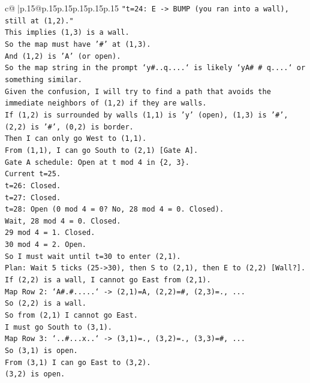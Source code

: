 \documentclass{article}
\begin{document}
{\begin{supertabular}{c@{$\;$}|p{.15\linewidth}@{}p{.15\linewidth}p{.15\linewidth}p{.15\linewidth}p{.15\linewidth}p{.15\linewidth}}
{{{\texttt{"t=24: E {-}> BUMP (you ran into a wall), still at (1,2)."} \\
\texttt{This implies (1,3) is a wall.} \\
\texttt{So the map must have '\#' at (1,3).} \\
\texttt{And (1,2) is 'A' (or open).} \\
\texttt{So the map string in the prompt `y\#..q....` is likely `yA\# \# q....` or something similar.} \\
\texttt{Given the confusion, I will try to find a path that avoids the immediate neighbors of (1,2) if they are walls.} \\
\texttt{If (1,2) is surrounded by walls (1,1) is 'y' (open), (1,3) is '\#', (2,2) is '\#', (0,2) is border.} \\
\texttt{Then I can only go West to (1,1).} \\
\texttt{From (1,1), I can go South to (2,1) {[}Gate A{]}.} \\
\texttt{Gate A schedule: Open at t mod 4 in \{2, 3\}.} \\
\texttt{Current t=25.} \\
\texttt{t=26: Closed.} \\
\texttt{t=27: Closed.} \\
\texttt{t=28: Open (0 mod 4 = 0? No, 28 mod 4 = 0. Closed).} \\
\texttt{Wait, 28 mod 4 = 0. Closed.} \\
\texttt{29 mod 4 = 1. Closed.} \\
\texttt{30 mod 4 = 2. Open.} \\
\texttt{So I must wait until t=30 to enter (2,1).} \\
\texttt{Plan: Wait 5 ticks (25{-}>30), then S to (2,1), then E to (2,2) {[}Wall?{]}.} \\
\texttt{If (2,2) is a wall, I cannot go East from (2,1).} \\
\texttt{Map Row 2: `A\#.\#.....` {-}> (2,1)=A, (2,2)=\#, (2,3)=., ...} \\
\texttt{So (2,2) is a wall.} \\
\texttt{So from (2,1) I cannot go East.} \\
\texttt{I must go South to (3,1).} \\
\texttt{Map Row 3: `..\#...x..` {-}> (3,1)=., (3,2)=., (3,3)=\#, ...} \\
\texttt{So (3,1) is open.} \\
\texttt{From (3,1) I can go East to (3,2).} \\
\texttt{(3,2) is open.} \\
}}}
\end{supertabular}}
\end{document}
